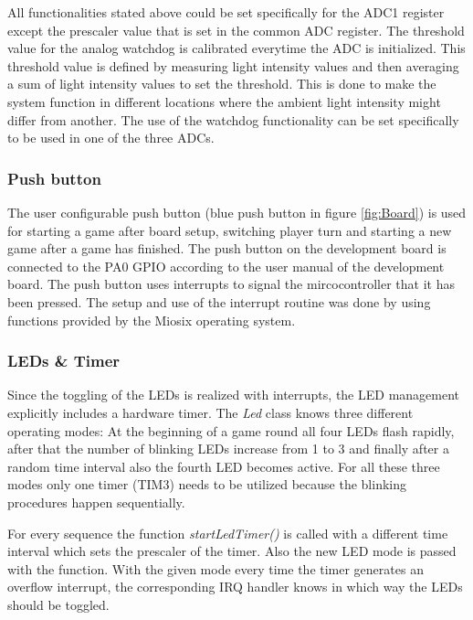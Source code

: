 All functionalities stated above could be set specifically for the ADC1 register except the prescaler value that is set in the common ADC register. The threshold value for the analog watchdog is calibrated everytime the ADC is initialized. This threshold value is defined by measuring light intensity values and then averaging a sum of light intensity values to set the threshold. This is done to make the system function in different locations where the ambient light intensity might differ from another. The use of the watchdog functionality can be set specifically to be used in one of the three ADCs.

\subsubsection{Push button}
The user configurable push button (blue push button in figure \ref{fig:Board}) is used for starting a game after board setup, switching player turn and starting a new game after a game has finished. The push button on the development board is connected to the PA0 GPIO according to the user manual \cite{UsrManual} of the development board. The push button uses interrupts to signal the mircocontroller that it has been pressed. The setup and use of the interrupt routine was done by using functions provided by the Miosix operating system.

\subsubsection{LEDs \& Timer}
Since the toggling of the LEDs is realized with interrupts, the LED management explicitly includes a hardware timer. The \emph{Led} class knows three different operating modes: At the beginning of a game round all four LEDs flash rapidly, after that the number of blinking LEDs increase from 1 to 3 and finally after a random time interval also the fourth LED becomes active. For all these three modes only one timer (TIM3) needs to be utilized because the blinking procedures happen sequentially.\\
\par
For every sequence the function \emph{startLedTimer()} is called with a different time interval which sets the prescaler of the timer. Also the new LED mode is passed with the function. With the given mode every time the timer generates an overflow interrupt, the corresponding IRQ handler knows in which way the LEDs should be toggled.

